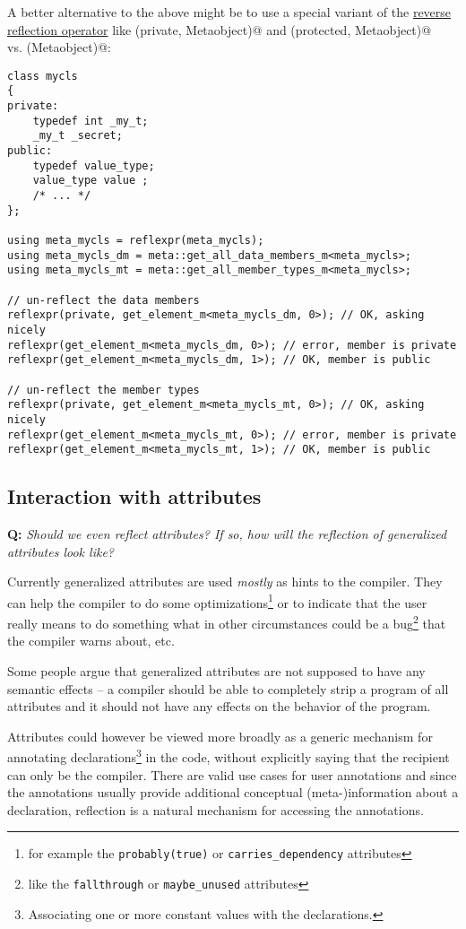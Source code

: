 A better alternative to the above might be to use a special variant of the
\hyperref[fut-reverse-reflection]{reverse reflection operator} like
\verb@reflexpr(private, Metaobject)@ and \verb@reflexpr(protected, Metaobject)@\\
vs. \verb@reflexpr(Metaobject)@:

\begin{verbatim}
class mycls
{
private:
	typedef int _my_t;
	_my_t _secret;
public:
	typedef value_type;
	value_type value ;
	/* ... */
};

using meta_mycls = reflexpr(meta_mycls);
using meta_mycls_dm = meta::get_all_data_members_m<meta_mycls>;
using meta_mycls_mt = meta::get_all_member_types_m<meta_mycls>;

// un-reflect the data members
reflexpr(private, get_element_m<meta_mycls_dm, 0>); // OK, asking nicely
reflexpr(get_element_m<meta_mycls_dm, 0>); // error, member is private
reflexpr(get_element_m<meta_mycls_dm, 1>); // OK, member is public

// un-reflect the member types
reflexpr(private, get_element_m<meta_mycls_mt, 0>); // OK, asking nicely
reflexpr(get_element_m<meta_mycls_mt, 0>); // error, member is private
reflexpr(get_element_m<meta_mycls_mt, 1>); // OK, member is public
\end{verbatim}

\subsection{Interaction with attributes}

\textbf{Q:} {\em Should we even reflect attributes? If so, how will the reflection
of generalized attributes look like?}

Currently generalized attributes are used {\em mostly} as hints to the compiler.
They can help the compiler to do some optimizations\footnote{for example the
\texttt{probably(true)} or \texttt{carries\_dependency} attributes} or to
indicate that the user really means to do something what in other circumstances
could be a bug\footnote{like the \texttt{fallthrough} or \texttt{maybe\_unused}
attributes} that the compiler warns about, etc.

Some people argue that generalized attributes are not supposed to have any
semantic effects -- a compiler should be able to completely strip 
a program of all attributes and it should not have any effects on the behavior
of the program.

Attributes could however be viewed more broadly as a generic mechanism for
annotating declarations\footnote{Associating one or more constant values with
the declarations.} in the code, without explicitly saying that the recipient
can only be the compiler.
There are valid use cases for user annotations and since the annotations
usually provide additional conceptual (meta-)information about a declaration,
reflection is a natural mechanism for accessing the annotations.

